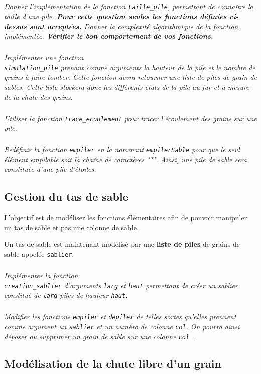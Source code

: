\subparagraph{}
\textit{Donner l'implémentation de la fonction \texttt{taille\_pile}, permettant de connaître la taille d'une pile. \textbf{Pour cette question seules les fonctions définies ci-dessus sont acceptées.} Donner la complexité algorithmique de la fonction implémentée. \textbf{Vérifier le bon comportement de vos fonctions.}}

\subparagraph{}
\textit{Implémenter une fonction \\ \texttt{simulation\_pile} prenant comme arguments la hauteur de la pile et le nombre de grains à faire tomber. Cette fonction devra retourner une liste de piles de grain de sables. Cette liste stockera donc les différents états de la pile au fur et à mesure de la chute des grains.}


\subparagraph{}
\textit{Utiliser la fonction  \texttt{trace\_ecoulement} pour tracer l'écoulement des grains sur une pile.}




\subparagraph{}
\textit{Redéfinir la fonction \texttt{empiler} en la nommant \texttt{empilerSable} pour que le seul élément empilable soit la chaîne de caractères "*". Ainsi, une pile de sable sera constituée d'une pile d'étoiles. }

\subsection*{Gestion du tas de sable}
\begin{obj}
L'objectif est de modéliser les fonctions élémentaires afin de pouvoir manipuler un tas de sable et pas une colonne de sable.
\end{obj}

Un tas de sable est maintenant modélisé par une \textbf{liste de piles} de grains de sable appelée \texttt{sablier}. 

\subparagraph{}\textit{Implémenter la fonction \\ \texttt{creation\_sablier} d'arguments \texttt{larg} et \texttt{haut} permettant de créer un sablier constitué de \texttt{larg} piles de hauteur \texttt{haut}.}


\subparagraph{}\textit{Modifier les fonctions \texttt{empiler} et \texttt{depiler} de telles sortes qu'elles prennent comme argument un \texttt{sablier} et un numéro de colonne \texttt{col}. On pourra ainsi déposer ou supprimer un grain de sable sur une colonne \texttt{col} .}

\subsection*{Modélisation de la chute libre d'un grain}

